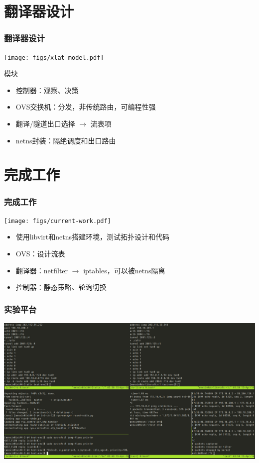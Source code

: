 \documentclass{beamer}
\begin{document}
\section{翻译器设计}
\begin{frame}
  \frametitle{翻译器设计}

  \begin{center}
    \texttt{[image: figs/xlat-model.pdf]}  
  \end{center}
  \begin{block}{模块}
    \begin{itemize}
    \item 控制器：观察、决策
    \item OVS交换机：分发，非传统路由，可编程性强
    \item 翻译/隧道出口选择 $\rightarrow$ 流表项
    \item netns封装：隔绝调度和出口路由
    \end{itemize}
  \end{block}
\end{frame}

\section{完成工作}
\begin{frame}
  \frametitle{完成工作}

  \begin{center}
    \texttt{[image: figs/current-work.pdf]}  
  \end{center}
  
  \begin{block}{}
    \begin{itemize}
    \item 使用libvirt和netns搭建环境，测试拓扑设计和代码
    \item OVS：设计流表
    \item 翻译器：netfilter $\rightarrow$ iptables，可以被netns隔离
    \item 控制器：静态策略、轮询切换
    \end{itemize}
  \end{block}
\end{frame}

\begin{frame}
  \frametitle{实验平台}

  \begin{center}
    \includegraphics[width=\textwidth]{figs/test-env.jpeg}
  \end{center}
\end{frame}
\end{document}
